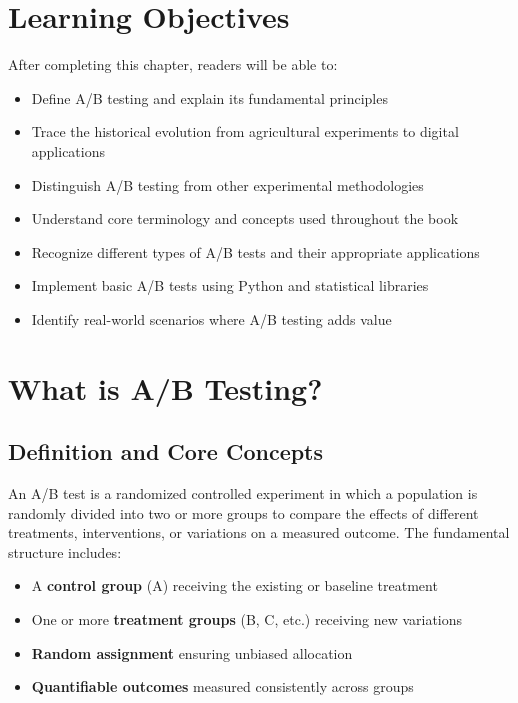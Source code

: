 \section{Learning Objectives}

After completing this chapter, readers will be able to:
\begin{itemize}
    \item Define A/B testing and explain its fundamental principles
    \item Trace the historical evolution from agricultural experiments to digital applications
    \item Distinguish A/B testing from other experimental methodologies
    \item Understand core terminology and concepts used throughout the book
    \item Recognize different types of A/B tests and their appropriate applications
    \item Implement basic A/B tests using Python and statistical libraries
    \item Identify real-world scenarios where A/B testing adds value
\end{itemize}

\section{What is A/B Testing?}

\subsection{Definition and Core Concepts}

\begin{definition}[A/B Test]
An A/B test is a randomized controlled experiment in which a population is randomly divided into two or more groups to compare the effects of different treatments, interventions, or variations on a measured outcome. The fundamental structure includes:
\begin{itemize}
    \item A \textbf{control group} (A) receiving the existing or baseline treatment
    \item One or more \textbf{treatment groups} (B, C, etc.) receiving new variations
    \item \textbf{Random assignment} ensuring unbiased allocation
    \item \textbf{Quantifiable outcomes} measured consistently across groups
\end{itemize}
\end{definition}


